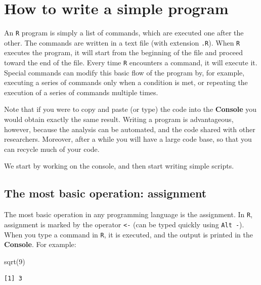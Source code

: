 \documentclass[
  letterpaper,
  DIV=11,
  numbers=noendperiod]{scrreprt}
\newenvironment{Shaded}{\begin{snugshade}}{\end{snugshade}}
\newcommand{\DecValTok}[1]{\textcolor[rgb]{0.68,0.00,0.00}{#1}}
\newcommand{\FunctionTok}[1]{\textcolor[rgb]{0.28,0.35,0.67}{#1}}
\newcommand{\NormalTok}[1]{\textcolor[rgb]{0.00,0.23,0.31}{#1}}
\begin{document}
\hypertarget{how-to-write-a-simple-program}{%
\section{How to write a simple
program}\label{how-to-write-a-simple-program}}

An \texttt{R} program is simply a list of commands, which are executed
one after the other. The commands are written in a text file (with
extension \texttt{.R}). When \texttt{R} executes the program, it will
start from the beginning of the file and proceed toward the end of the
file. Every time \texttt{R} encounters a command, it will execute it.
Special commands can modify this basic flow of the program by, for
example, executing a series of commands only when a condition is met, or
repeating the execution of a series of commands multiple times.

Note that if you were to copy and paste (or type) the code into the
\textbf{Console} you would obtain exactly the same result. Writing a
program is advantageous, however, because the analysis can be automated,
and the code shared with other researchers. Moreover, after a while you
will have a large code base, so that you can recycle much of your code.

We start by working on the console, and then start writing simple
scripts.

\hypertarget{the-most-basic-operation-assignment}{%
\subsection{The most basic operation:
assignment}\label{the-most-basic-operation-assignment}}

The most basic operation in any programming language is the assignment.
In \texttt{R}, assignment is marked by the operator
\texttt{\textless{}-} (can be typed quickly using \texttt{Alt\ -}). When
you type a command in \texttt{R}, it is executed, and the output is
printed in the \textbf{Console}. For example:

\begin{Shaded}
\begin{Highlighting}[]
\FunctionTok{sqrt}\NormalTok{(}\DecValTok{9}\NormalTok{)}
\end{Highlighting}
\end{Shaded}

\begin{verbatim}
[1] 3
\end{verbatim}
\end{document}
